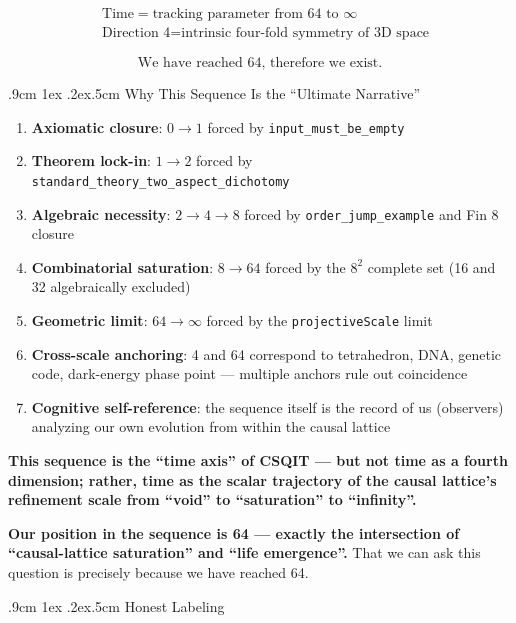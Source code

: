 \documentclass[aps,prd,twocolumn,nofootinbib,floatfix]{revtex4-2}
\makeatletter
\def\subsection{%
  \@startsection{subsection}{2}{\z@}
    {.9cm \@plus1ex \@minus .2ex}{.5cm}
    {\normalfont\normalsize\bfseries\centering}%
}
\makeatother
\begin{document}
\[
\boxed{
\begin{aligned}
&\text{Time} = \text{tracking parameter from 64 to } \infty \\
&\text{Direction 4} = \text{intrinsic four-fold symmetry of 3D space}
\end{aligned}
}
\]

\[
\boxed{
\text{We have reached 64, therefore we exist.}
}
\]

\subsection{Why This Sequence Is the ``Ultimate Narrative''}

\begin{enumerate}
    \item \textbf{Axiomatic closure}: $0 \to 1$ forced by \texttt{input\_must\_be\_empty}
    \item \textbf{Theorem lock-in}: $1 \to 2$ forced by \texttt{standard\_theory\_two\_aspect\_dichotomy}
    \item \textbf{Algebraic necessity}: $2 \to 4 \to 8$ forced by \texttt{order\_jump\_example} and Fin 8 closure
    \item \textbf{Combinatorial saturation}: $8 \to 64$ forced by the $8^2$ complete set (16 and 32 algebraically excluded)
    \item \textbf{Geometric limit}: $64 \to \infty$ forced by the \texttt{projectiveScale} limit
    \item \textbf{Cross-scale anchoring}: 4 and 64 correspond to tetrahedron, DNA, genetic code, dark-energy phase point --- multiple anchors rule out coincidence
    \item \textbf{Cognitive self-reference}: the sequence itself is the record of us (observers) analyzing our own evolution from within the causal lattice
\end{enumerate}

\textbf{This sequence is the ``time axis'' of CSQIT --- but not time as a fourth dimension; rather, time as the scalar trajectory of the causal lattice's refinement scale from ``void'' to ``saturation'' to ``infinity''.}

\textbf{Our position in the sequence is 64 --- exactly the intersection of ``causal-lattice saturation'' and ``life emergence''.} That we can ask this question is precisely because we have reached 64.

\subsection{Honest Labeling}
\end{document}
